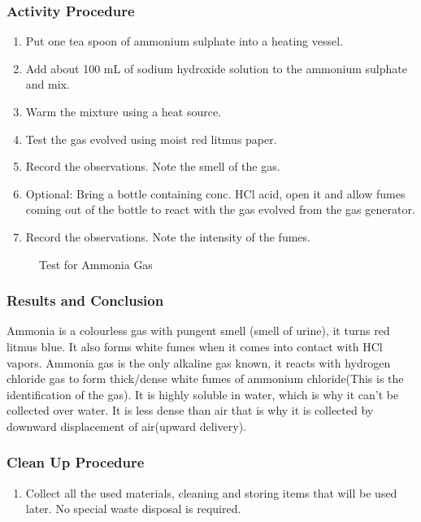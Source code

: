 \subsubsection*{Activity Procedure}
\begin{enumerate}
\item{Put one tea spoon of ammonium sulphate into a heating vessel.}
\item{Add about 100 mL of sodium hydroxide solution to the ammonium sulphate and mix.}
\item{Warm the mixture using a heat source.}
\item{Test the gas evolved using moist red litmus paper.}
\item{Record the observations. Note the smell of the gas.}
\item{Optional: Bring a bottle containing conc. HCl acid, open it and allow fumes coming out of the bottle to react with the gas evolved from the gas generator.}
\item{Record the observations. Note the intensity of the fumes.}
\end{enumerate}


\begin{figure}[h]
\begin{center}
\def\svgwidth{200pt}

\caption{Test for Ammonia Gas}
\end{center}
\end{figure}

\subsubsection*{Results and Conclusion}
Ammonia is a colourless gas with pungent smell (smell of urine), it turns red litmus blue. It also forms white fumes when it comes into contact with HCl vapors.
Ammonia gas is the only alkaline gas known, it reacts with hydrogen chloride gas to form thick/dense white fumes of ammonium chloride(This is the identification of the gas). It is highly soluble in water, which is why it can't be collected over water. It is less dense than air that is why it is collected by downward displacement of air(upward delivery).

\subsubsection*{Clean Up Procedure}
\begin{enumerate}
\item{Collect all the used materials, cleaning and storing items that will be used later. No special waste disposal is required.}
\end{enumerate}

